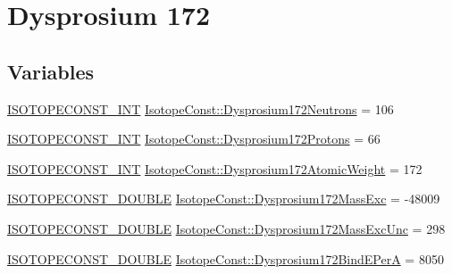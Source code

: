 \hypertarget{group___isotope_const-_dysprosium-_dy172}{}\section{Dysprosium 172}
\label{group___isotope_const-_dysprosium-_dy172}
\subsection*{Variables}
\begin{DoxyCompactItemize}
\item 
\mbox{\hyperlink{group___isotope_const-_macros_ga5f18360b3e99483a35c32d789e62621c}{I\+S\+O\+T\+O\+P\+E\+C\+O\+N\+S\+T\+\_\+\+I\+NT}} \mbox{\hyperlink{group___isotope_const-_dysprosium-_dy172_ga3d5ca52e0b879cf66da6915edecd5221}{Isotope\+Const\+::\+Dysprosium172\+Neutrons}} = 106
\item 
\mbox{\hyperlink{group___isotope_const-_macros_ga5f18360b3e99483a35c32d789e62621c}{I\+S\+O\+T\+O\+P\+E\+C\+O\+N\+S\+T\+\_\+\+I\+NT}} \mbox{\hyperlink{group___isotope_const-_dysprosium-_dy172_ga97973227a9774330ea9c0b4691684ef0}{Isotope\+Const\+::\+Dysprosium172\+Protons}} = 66
\item 
\mbox{\hyperlink{group___isotope_const-_macros_ga5f18360b3e99483a35c32d789e62621c}{I\+S\+O\+T\+O\+P\+E\+C\+O\+N\+S\+T\+\_\+\+I\+NT}} \mbox{\hyperlink{group___isotope_const-_dysprosium-_dy172_ga29f92cfae0c339e5fb28865f8fd8be80}{Isotope\+Const\+::\+Dysprosium172\+Atomic\+Weight}} = 172
\item 
\mbox{\hyperlink{group___isotope_const-_macros_ga8f45a7272ce02c0b4c65c44636ed719a}{I\+S\+O\+T\+O\+P\+E\+C\+O\+N\+S\+T\+\_\+\+D\+O\+U\+B\+LE}} \mbox{\hyperlink{group___isotope_const-_dysprosium-_dy172_gaf0422b3306b30a3f86c16621b4b2980d}{Isotope\+Const\+::\+Dysprosium172\+Mass\+Exc}} = -\/48009
\item 
\mbox{\hyperlink{group___isotope_const-_macros_ga8f45a7272ce02c0b4c65c44636ed719a}{I\+S\+O\+T\+O\+P\+E\+C\+O\+N\+S\+T\+\_\+\+D\+O\+U\+B\+LE}} \mbox{\hyperlink{group___isotope_const-_dysprosium-_dy172_ga6b5c331025b56cd4348faa992e30e75e}{Isotope\+Const\+::\+Dysprosium172\+Mass\+Exc\+Unc}} = 298
\item 
\mbox{\hyperlink{group___isotope_const-_macros_ga8f45a7272ce02c0b4c65c44636ed719a}{I\+S\+O\+T\+O\+P\+E\+C\+O\+N\+S\+T\+\_\+\+D\+O\+U\+B\+LE}} \mbox{\hyperlink{group___isotope_const-_dysprosium-_dy172_gab36f29eebe45de3bbccb5871337c6f1c}{Isotope\+Const\+::\+Dysprosium172\+Bind\+E\+PerA}} = 8050
\item 

\end{DoxyCompactItemize}
